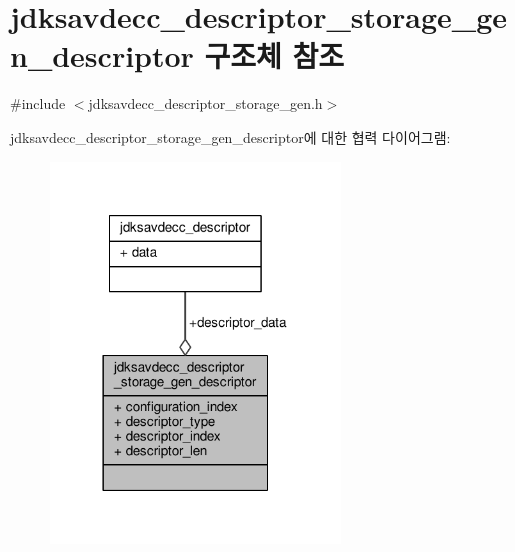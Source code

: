 \hypertarget{structjdksavdecc__descriptor__storage__gen__descriptor}{}\section{jdksavdecc\+\_\+descriptor\+\_\+storage\+\_\+gen\+\_\+descriptor 구조체 참조}
\label{structjdksavdecc__descriptor__storage__gen__descriptor}


{\ttfamily \#include $<$jdksavdecc\+\_\+descriptor\+\_\+storage\+\_\+gen.\+h$>$}



jdksavdecc\+\_\+descriptor\+\_\+storage\+\_\+gen\+\_\+descriptor에 대한 협력 다이어그램\+:
\nopagebreak
\begin{figure}[H]
\begin{center}
\leavevmode
\includegraphics[width=218pt]{structjdksavdecc__descriptor__storage__gen__descriptor__coll__graph}
\end{center}
\end{figure}
